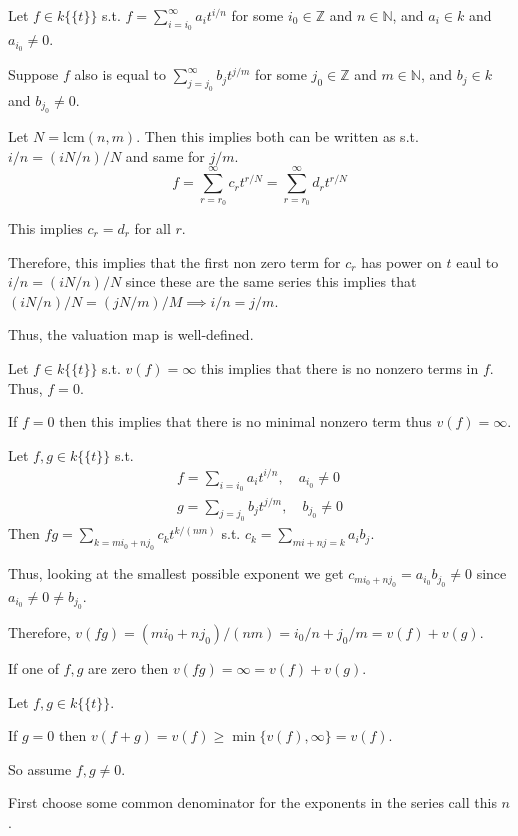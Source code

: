 \documentclass[12pt, letterpaper]{article}
\newcommand{\Z}{\mathbb{Z}}
\newcommand{\N}{\mathbb{N}}
\begin{document}
\qh
\begin{subproblem}{}
    
\end{subproblem}
\begin{problemproof}
    Let $f \in k\{\{t\}\}$ s.t. $f=\sum_{i=i_0}^\infty a_i t^{i/n}$ for some $i_0 \in \Z$ and $n \in \N$, and $a_i \in k$ and $a_{i_0} \neq 0$.

    Suppose $f$ also is equal to $\sum_{j=j_0}^\infty b_j t^{j/m}$ for some $j_0 \in \Z$ and $m \in \N$, and $b_j \in k$ and $b_{j_0} \neq 0$.

    Let $N = \mathrm{lcm}(n,m)$. Then this implies both can be written as s.t. $i/n = (iN/n)/N$ and same for $j/m$.
    \[f=\sum_{r=r_0}^\infty c_r t^{r/N} = \sum_{r=r_0}^\infty d_r t^{r/N}\]

    This implies $c_r = d_r$ for all $r$.

    Therefore, this implies that the first non zero term for $c_r$ has power on $t$ eaul to $i/n=(iN/n)/N$ since these are the same series this implies that $(iN/n)/N=(jN/m)/M \implies i/n=j/m$.

    Thus, the valuation map is well-defined.

    Let $f \in k\{\{t\}\}$ s.t. $v(f)=\infty$ this implies that there is no nonzero terms in $f$. Thus, $f=0$.

    If $f=0$ then this implies that there is no minimal nonzero term thus $v(f)=\infty$.

    Let $f,g \in k\{\{t\}\}$ s.t.
    \begin{align}
        f = \sum_{i=i_0}a_i t^{i/n}, \quad a_{i_0} \neq 0\\
        g = \sum_{j=j_0}b_j t^{j/m}, \quad b_{j_0}  \neq 0
    \end{align}
    Then $fg = \sum_{k=mi_0+nj_0} c_k t^{k/(nm)}$ s.t. $c_k = \sum_{mi+nj=k}a_ib_j$.

    Thus, looking at the smallest possible exponent we get $c_{mi_0+nj_0}=a_{i_0}b_{j_0} \neq 0$ since $a_{i_0} \neq 0 \neq b_{j_0}$.

    Therefore, $v(fg)=(mi_0+nj_0)/(nm) = i_0/n + j_0/m = v(f)+v(g)$.

    If one of $f,g$ are zero then $v(fg)=\infty = v(f)+v(g)$.

    Let $f,g \in k\{\{t\}\}$.

    If $g = 0$ then $v(f+g) = v(f) \geq \min \{v(f), \infty\}= v(f)$.

    So assume $f,g \neq 0$.

    First choose some common denominator for the exponents in the series call this $n$.


\end{problemproof}
\end{document}
